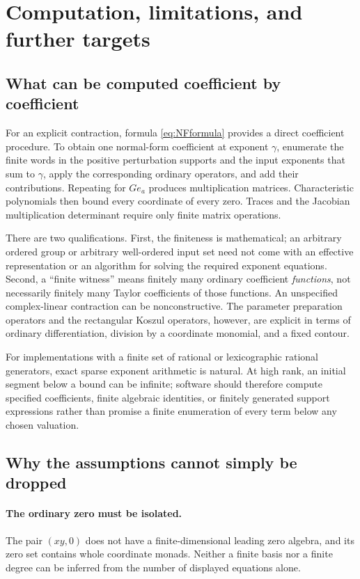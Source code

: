 \documentclass[11pt,letterpaper]{article}
\theoremstyle{definition}
\theoremstyle{remark}
\begin{document}
\section{Computation, limitations, and further targets}
\label{sec:scope}

\subsection{What can be computed coefficient by coefficient}
For an explicit contraction, formula \eqref{eq:NFformula} provides a direct coefficient procedure. To obtain one normal-form coefficient at exponent $\gamma$, enumerate the finite words in the positive perturbation supports and the input exponents that sum to $\gamma$, apply the corresponding ordinary operators, and add their contributions. Repeating for $Ge_a$ produces multiplication matrices. Characteristic polynomials then bound every coordinate of every zero. Traces and the Jacobian multiplication determinant require only finite matrix operations.

There are two qualifications. First, the finiteness is mathematical; an arbitrary ordered group or arbitrary well-ordered input set need not come with an effective representation or an algorithm for solving the required exponent equations. Second, a ``finite witness'' means finitely many ordinary coefficient \emph{functions}, not necessarily finitely many Taylor coefficients of those functions. An unspecified complex-linear contraction can be nonconstructive. The parameter preparation operators and the rectangular Koszul operators, however, are explicit in terms of ordinary differentiation, division by a coordinate monomial, and a fixed contour.

For implementations with a finite set of rational or lexicographic rational generators, exact sparse exponent arithmetic is natural. At high rank, an initial segment below a bound can be infinite; software should therefore compute specified coefficients, finite algebraic identities, or finitely generated support expressions rather than promise a finite enumeration of every term below any chosen valuation.

\subsection{Why the assumptions cannot simply be dropped}
\paragraph{The ordinary zero must be isolated.}
The pair $(xy,0)$ does not have a finite-dimensional leading zero algebra, and its zero set contains whole coordinate monads. Neither a finite basis nor a finite degree can be inferred from the number of displayed equations alone.
\end{document}
